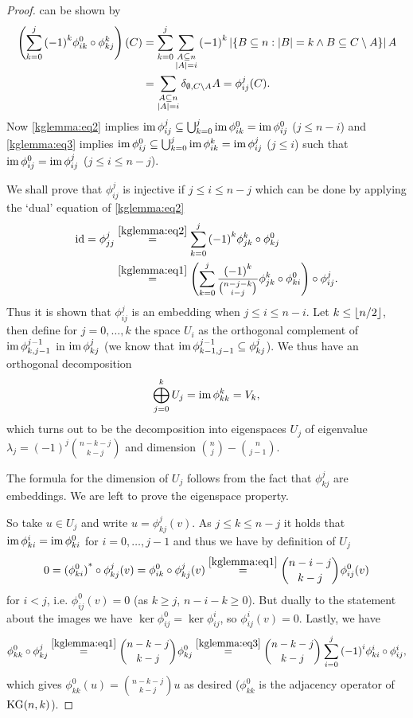 \begin{proof}
  can be shown by
  \begin{align*}
      \left(\sum_{k=0}^{j}{{(-1)}^k\phi^0_{ik}\circ\phi^k_{kj}}\right)(C)
      & = \sum_{k=0}^{j}\sum_{\substack{A\subseteq n\\ \left\vert{A}\right\vert=i}}{{(-1)}^k\left\vert{\{B\subseteq n:\left\vert{B}\right\vert=k\wedge B\subseteq C\setminus A\}}\right\vert A}\\
      & = \sum_{\substack{A\subseteq n\\ \left\vert{A}\right\vert=i}}{\delta_{\emptyset,C\setminus A}A} = \phi^j_{ij}(C)\text{.}
  \end{align*}
  Now \autoref{kglemma:eq2}
  implies $\mathop\mathrm{im}\phi_{ij}^j\subseteq\bigcup_{k=0}^j{\mathop\mathrm{im}\phi_{ik}^0}=\mathop\mathrm{im}\phi_{ij}^0$ ($j\leq n-i$) and \autoref{kglemma:eq3}
  implies $\mathop\mathrm{im}\phi_{ij}^0\subseteq\bigcup_{k=0}^j{\mathop\mathrm{im}\phi_{ik}^k}=\mathop\mathrm{im}\phi_{ij}^j$ ($j\leq i$) such that $\mathop\mathrm{im}\phi_{ij}^0=\mathop\mathrm{im}\phi_{ij}^j$ ($j\leq i\leq n-j$).
  
  We shall prove that $\phi^j_{ij}$ is injective if $j\leq i\leq n-j$ which can be done by applying the `dual' equation of \autoref{kglemma:eq2}
  \begin{align*}
      \id=\phi^j_{jj}
      & \stackrel{\autoref{kglemma:eq2}}{=}
      \sum_{k=0}^{j}{{(-1)}^k\phi^k_{jk}\compose\phi^0_{kj}}\\
      & \stackrel{\autoref{kglemma:eq1}}{=} \left(\sum_{k=0}^{j}{\frac{{(-1)}^k}{\binom{n-j-k}{i-j}}\phi^k_{jk}\compose\phi^0_{ki}}\right)\compose\phi^j_{ij}\text{.}
  \end{align*}
  Thus it is shown that $\phi^j_{ij}$ is an embedding when $j\leq i\leq n-i$. Let $k\leq \left\lfloor n/2\right\rfloor$, then define for $j=0,\ldots,k$ the space $U_i$ as the orthogonal complement of $\mathop\mathrm{im}\phi_{k,j-1}^{j-1}$ in $\mathop\mathrm{im}\phi_{kj}^j$ (we know that $\mathop\mathrm{im}\phi_{k-1,j-1}^{j-1}\subseteq\phi_{kj}^j$). We thus have an orthogonal decomposition
  $$
  \bigoplus_{j=0}^k{U_j}=\mathop\mathrm{im}\phi_{kk}^k=V_k,
  $$
  which turns out to be the decomposition into eigenspaces $U_j$ of eigenvalue $\lambda_j={(-1)}^j\binom{n-k-j}{k-j}$ and dimension $\binom{n}{j}-\binom{n}{j-1}$.

  The formula for the dimension of $U_j$ follows from the fact that $\phi_{kj}^j$ are embeddings. We are left to prove the eigenspace property.

  So take $u\in U_j$ and write $u=\phi_{kj}^j(v)$. As $j\leq k\leq n-j$ it holds that $\mathop\mathrm{im}\phi_{ki}^i=\mathop\mathrm{im}\phi_{ki}^0$ for $i=0,\ldots,j-1$ and thus we have by definition of $U_j$
  $$
  0=\dual{(\phi_{ki}^0)}\compose\phi_{kj}^j(v)=\phi_{ik}^0\compose\phi_{kj}^j(v)\stackrel{\autoref{kglemma:eq1}}{=}\binom{n-i-j}{k-j}\phi_{ij}^0(v)
  $$
  for $i<j$, i.e. $\phi_{ij}^0(v)=0$ (as $k\geq j$, $n-i-k\geq 0$). But dually to the statement about the images we have $\ker\phi_{ij}^0=\ker\phi_{ij}^i$, so $\phi_{ij}^i(v)=0$.
  Lastly, we have
  $$
  \phi_{kk}^0\compose\phi_{kj}^j\stackrel{\autoref{kglemma:eq1}}{=}\binom{n-k-j}{k-j}\phi_{kj}^0\stackrel{\autoref{kglemma:eq3}}{=}\binom{n-k-j}{k-j}\sum_{i=0}^j{{(-1)}^i\phi_{ki}^i\compose\phi_{ij}^i},
  $$
  which gives $\phi_{kk}^0(u)=\binom{n-k-j}{k-j}u$ as desired ($\phi_{kk}^0$ is the adjacency operator of $\mathop\mathrm{KG}(n,k)$).
\end{proof}

